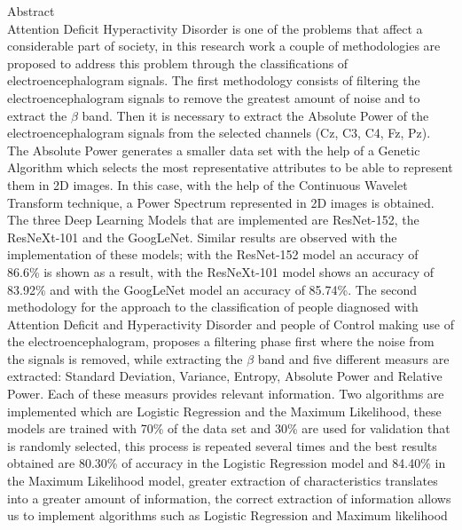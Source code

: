 \documentclass[letterpaper,12pt,openright,oneside]{article}
\begin{document}
\pagebreak



Abstract\\



Attention Deficit Hyperactivity Disorder is one of the problems that affect a considerable part of society, in this research work a couple of methodologies are proposed to address this problem through the classifications of electroencephalogram signals. The first methodology consists of filtering the electroencephalogram signals to remove the greatest amount of noise and to extract the $\beta$ band. Then it is necessary to extract the Absolute Power of the electroencephalogram signals from the selected channels (Cz, C3, C4, Fz, Pz). The Absolute Power generates a smaller data set with the help of a Genetic Algorithm which selects the most representative attributes to be able to represent them in 2D images. In this case, with the help of the Continuous Wavelet Transform technique, a Power Spectrum represented in 2D images is obtained. The three Deep Learning Models that are implemented are  ResNet-152, the ResNeXt-101 and the GoogLeNet. Similar results are observed with the implementation of these models; with the ResNet-152 model an accuracy of 86.6\% is shown as a result, with the ResNeXt-101 model shows an accuracy of 83.92\% and with the GoogLeNet model an accuracy of 85.74\%.
The second methodology for the approach to the classification of people diagnosed with Attention Deficit and Hyperactivity Disorder and people of Control making use of the electroencephalogram, proposes a filtering phase first where the noise from the signals is removed, while extracting the $\beta$ band and five different measurs are extracted: Standard Deviation, Variance, Entropy, Absolute Power and Relative Power. Each of these measurs provides relevant information. Two algorithms are implemented which are Logistic Regression and the Maximum Likelihood, these models are trained with 70\% of the data set and 30\% are used for validation that is randomly selected, this process is repeated several times and the best results obtained are 80.30\% of accuracy in the Logistic Regression model and 84.40\% in the Maximum Likelihood model, greater extraction of characteristics translates into a greater amount of information, the correct extraction of information allows us to implement algorithms such as Logistic Regression and Maximum likelihood   
\end{document}
